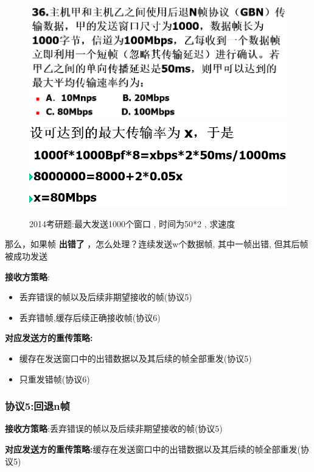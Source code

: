\documentclass[UTF8,a4paper]{ctexart}
\begin{document}
\begin{figure}[H]
  \centering
  \includegraphics[scale = 0.3]{assets/jisuanjiwangluo_13ba7.png}
\includegraphics[scale = 0.3]{assets/jisuanjiwangluo_43d86.png}
  \caption{2014考研题:最大发送1000个窗口 , 时间为50*2 , 求速度}
\end{figure}

那么，如果帧 \textbf{出错了} ，怎么处理？连续发送w个数据帧, 其中一帧出错, 但其后帧被成功发送

\textbf{接收方策略}:
\begin{itemize}
  \item 丢弃错误的帧以及后续非期望接收的帧(协议5)
  \item 丢弃错帧,缓存后续正确接收帧(协议6)
\end{itemize}

\textbf{对应发送方的重传策略:}
\begin{itemize}
  \item 缓存在发送窗口中的出错数据以及其后续的帧全部重发(协议5)
  \item 只重发错帧(协议6)
\end{itemize}

\subsubsection{协议5:回退n帧}
\textbf{接收方策略}:丢弃错误的帧以及后续非期望接收的帧(协议5)

\textbf{对应发送方的重传策略:}缓存在发送窗口中的出错数据以及其后续的帧全部重发(协议5)
\end{document}
